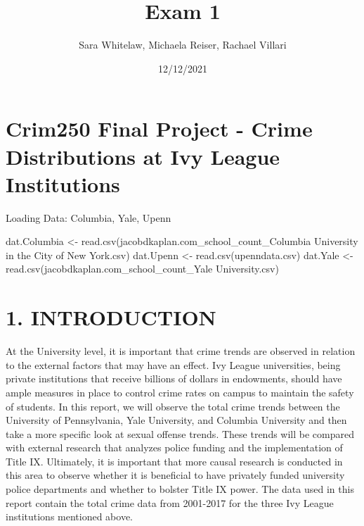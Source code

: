 \documentclass[
]{article}
\title{Exam 1}
\author{Sara Whitelaw, Michaela Reiser, Rachael Villari}
\date{12/12/2021}
\newenvironment{Shaded}{\begin{snugshade}}{\end{snugshade}}
\newcommand{\FunctionTok}[1]{\textcolor[rgb]{0.00,0.00,0.00}{#1}}
\newcommand{\NormalTok}[1]{#1}
\newcommand{\OtherTok}[1]{\textcolor[rgb]{0.56,0.35,0.01}{#1}}
\newcommand{\StringTok}[1]{\textcolor[rgb]{0.31,0.60,0.02}{#1}}
\begin{document}
\maketitle

\hypertarget{crim250-final-project---crime-distributions-at-ivy-league-institutions}{%
\section{Crim250 Final Project - Crime Distributions at Ivy League
Institutions}\label{crim250-final-project---crime-distributions-at-ivy-league-institutions}}

Loading Data: Columbia, Yale, Upenn

\begin{Shaded}
\begin{Highlighting}[]
\NormalTok{dat.Columbia }\OtherTok{\textless{}{-}} \FunctionTok{read.csv}\NormalTok{(}\StringTok{\textquotesingle{}jacobdkaplan.com\_school\_count\_Columbia University in the City of New York.csv\textquotesingle{}}\NormalTok{)}
\NormalTok{dat.Upenn }\OtherTok{\textless{}{-}} \FunctionTok{read.csv}\NormalTok{(}\StringTok{\textquotesingle{}upenndata.csv\textquotesingle{}}\NormalTok{)}
\NormalTok{dat.Yale }\OtherTok{\textless{}{-}} \FunctionTok{read.csv}\NormalTok{(}\StringTok{\textquotesingle{}jacobdkaplan.com\_school\_count\_Yale University.csv\textquotesingle{}}\NormalTok{)}
\end{Highlighting}
\end{Shaded}

\hypertarget{introduction}{%
\section{1. INTRODUCTION}\label{introduction}}

At the University level, it is important that crime trends are observed
in relation to the external factors that may have an effect. Ivy League
universities, being private institutions that receive billions of
dollars in endowments, should have ample measures in place to control
crime rates on campus to maintain the safety of students. In this
report, we will observe the total crime trends between the University of
Pennsylvania, Yale University, and Columbia University and then take a
more specific look at sexual offense trends. These trends will be
compared with external research that analyzes police funding and the
implementation of Title IX. Ultimately, it is important that more causal
research is conducted in this area to observe whether it is beneficial
to have privately funded university police departments and whether to
bolster Title IX power. The data used in this report contain the total
crime data from 2001-2017 for the three Ivy League institutions
mentioned above.
\end{document}
